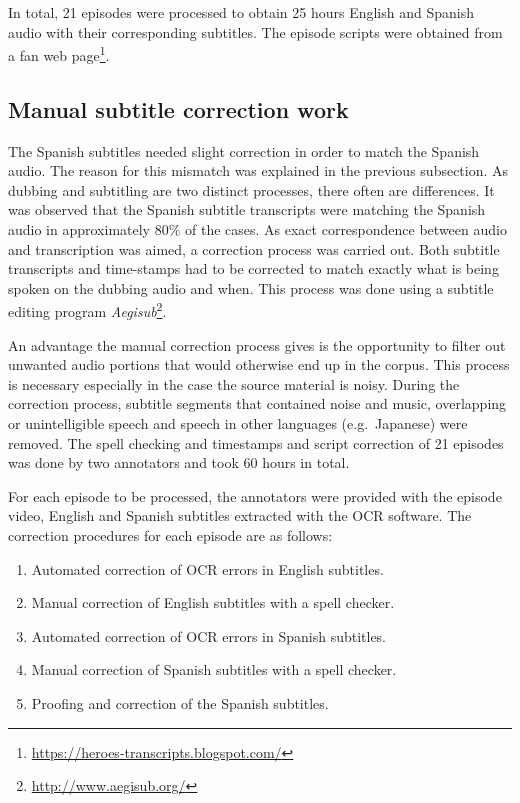 In total, 21 episodes were processed to obtain 25 hours English and Spanish audio with their corresponding subtitles. The episode scripts were obtained from a fan web page\footnote{\url{https://heroes-transcripts.blogspot.com/}}. 

\subsection*{Manual subtitle correction work}
The Spanish subtitles needed slight correction in order to match the Spanish audio. The reason for this mismatch was explained in the previous subsection. As dubbing and subtitling are two distinct processes, there often are differences. It was observed that the Spanish subtitle transcripts were matching the Spanish audio in approximately 80\% of the cases. As exact correspondence between audio and transcription was aimed, a correction process was carried out. Both subtitle transcripts and time-stamps had to be corrected to match exactly what is being spoken on the dubbing audio and when. This process was done using a subtitle editing program \textit{Aegisub}\footnote{\url{http://www.aegisub.org/}}. 

An advantage the manual correction process gives is the opportunity to filter out unwanted audio portions that would otherwise end up in the corpus. This process is necessary especially in the case the source material is noisy. During the correction process, subtitle segments that contained noise and music, overlapping or unintelligible speech and speech in other languages (e.g.~Japanese) were removed. The spell checking and timestamps and script correction of 21 episodes was done by two annotators and took 60 hours in total. 

For each episode to be processed, the annotators were provided with the episode video, English and Spanish subtitles extracted with the OCR software. The correction procedures for each episode are as follows:
\begin{enumerate}
    \item Automated correction of OCR errors in English subtitles.
    \item Manual correction of English subtitles with a spell checker.
    \item Automated correction of OCR errors in Spanish subtitles.
    \item Manual correction of Spanish subtitles with a spell checker.
    \item Proofing and correction of the Spanish subtitles.
\end{enumerate}

